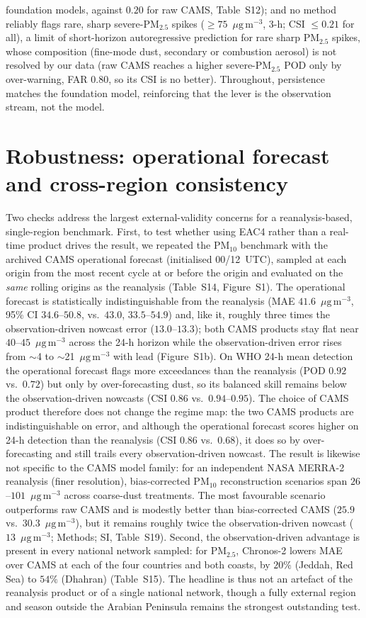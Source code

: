 \documentclass[11pt]{article}
\newcommand*{\ugm}{\ensuremath{\mu\mathrm{g\,m^{-3}}}}
\newcommand*{\pmtf}{\ensuremath{\mathrm{PM_{2.5}}}}
\newcommand*{\pmten}{\ensuremath{\mathrm{PM_{10}}}}
\begin{document}
foundation models, against $0.20$ for raw CAMS, Table~S12); and no method reliably flags rare, sharp severe-\pmtf{} spikes ($\geq75$~\ugm, 3-h; CSI $\leq0.21$ for all), a limit of short-horizon autoregressive prediction for rare sharp \pmtf{} spikes, whose composition (fine-mode dust, secondary or combustion aerosol) is not resolved by our data (raw CAMS reaches a higher severe-\pmtf{} POD only by over-warning, FAR $0.80$, so its CSI is no better). Throughout, persistence matches the foundation model, reinforcing that the lever is the observation stream, not the model.

\section{Robustness: operational forecast and cross-region consistency}
Two checks address the largest external-validity concerns for a reanalysis-based, single-region benchmark. First, to test whether using EAC4 rather than a real-time product drives the result, we repeated the \pmten{} benchmark with the archived CAMS operational forecast (initialised 00/12~UTC), sampled at each origin from the most recent cycle at or before the origin and evaluated on the \emph{same} rolling origins as the reanalysis (Table~S14, Figure~S1). The operational forecast is statistically indistinguishable from the reanalysis (MAE $41.6$~\ugm, 95\% CI $34.6$--$50.8$, vs.\ $43.0$, $33.5$--$54.9$) and, like it, roughly three times the observation-driven nowcast error ($13.0$--$13.3$); both CAMS products stay flat near $40$--$45$~\ugm{} across the 24-h horizon while the observation-driven error rises from $\sim$4 to $\sim$21~\ugm{} with lead (Figure~S1b). On WHO 24-h mean detection the operational forecast flags more exceedances than the reanalysis (POD $0.92$ vs.\ $0.72$) but only by over-forecasting dust, so its balanced skill remains below the observation-driven nowcasts (CSI $0.86$ vs.\ $0.94$--$0.95$). The choice of CAMS product therefore does not change the regime map: the two CAMS products are indistinguishable on error, and although the operational forecast scores higher on 24-h detection than the reanalysis (CSI $0.86$ vs.\ $0.68$), it does so by over-forecasting and still trails every observation-driven nowcast. The result is likewise not specific to the CAMS model family: for an independent NASA MERRA-2 reanalysis (finer resolution), bias-corrected \pmten{} reconstruction scenarios span $26$--$101$~\ugm{} across coarse-dust treatments. The most favourable scenario outperforms raw CAMS and is modestly better than bias-corrected CAMS ($25.9$ vs.\ $30.3$~\ugm), but it remains roughly twice the observation-driven nowcast ($13$~\ugm; Methods; SI, Table~S19). Second, the observation-driven advantage is present in every national network sampled: for \pmtf{}, Chronos-2 lowers MAE over CAMS at each of the four countries and both coasts, by $20\%$ (Jeddah, Red Sea) to $54\%$ (Dhahran) (Table~S15). The headline is thus not an artefact of the reanalysis product or of a single national network, though a fully external region and season outside the Arabian Peninsula remains the strongest outstanding test.
\end{document}
